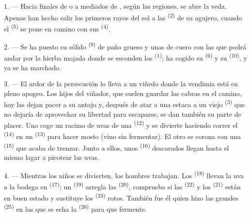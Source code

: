 \VUsaut{6.0mm}
\VUsaut{3.6mm}

\VUsaut{1.4mm}
\VUsaut{4.0mm}

1. --- Hacia finales de  o a mediados de
, según las regiones, se abre la veda. Apenas han
hecho salir los primeros rayos del sol a las 
\textsuperscript{(2)} de su agujero, cuando el  \textsuperscript{(5)} se
pone en camino con sus  \textsuperscript{(4)}.

2. --- Se ha puesto su sólido  \textsuperscript{(9)} de paño
grueso y unas  de cuero con las que podrá andar por la
hierba mojada donde se esconden los  \textsuperscript{(1)}; ha cogido
su  \textsuperscript{(6)} y su  \textsuperscript{(10)}, y ya
se
ha marchado.

3. --- El ardor de la persecución lo lleva a un viñedo donde la vendimia
está en pleno apogeo. Los hijos del viñador, que suelen guardar las
cabras en el camino, hoy las dejan pacer a su antojo y, después de atar a
una estaca a un viejo  \textsuperscript{(3)} que no dejaría de
aprovechar su libertad para escaparse, se dan también su parte de placer.
Uno coge un racimo de uvas de una  \textsuperscript{(12)} y
se divierte haciendo correr el  \textsuperscript{(14)} en un 
\textsuperscript{(13)} para hacer mosto (vino sin fermentar). El otro se corona con
una  \textsuperscript{(15)} que acaba de trenzar. Junto a
ellos, unos  \textsuperscript{(16)} descarados llegan hasta el
mismo lagar a picotear las uvas.

4. --- Mientras los niños se divierten, los hombres trabajan. Los
 \textsuperscript{(18)} llevan la uva a la bodega en
 \textsuperscript{(17)}; un  \textsuperscript{(19)} arregla
las  \textsuperscript{(20)}, comprueba si las 
\textsuperscript{(22)} y los  \textsuperscript{(21)} están en buen estado y
sustituye los  \textsuperscript{(23)} rotos. También fue él quien hizo
las grandes  \textsuperscript{(25)} en las que se echa la 
\textsuperscript{(26)} para que fermente.


